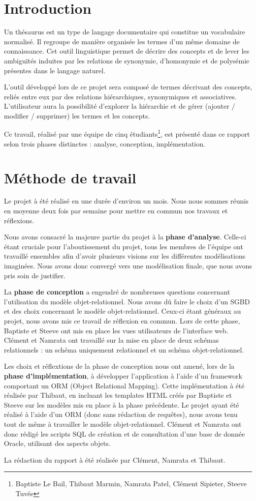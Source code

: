 \chapter*{Introduction}
Un thésaurus est un type de langage documentaire qui constitue un vocabulaire normalisé. Il regroupe de manière organisée les termes d'un même domaine de connaissance. Cet outil linguistique permet de décrire des concepts et de lever les ambiguïtés induites par les relations de synonymie, d'homonymie et de polysémie présentes dans le langage naturel.

L'outil développé lors de ce projet sera composé de termes décrivant des concepts, reliés entre eux par des relations hiérarchiques, synonymiques et associatives. L'utilisateur aura la possibilité d'explorer la hiérarchie et de gérer (ajouter / modifier / supprimer) les termes et les concepts.

Ce travail, réalisé par une équipe de cinq étudiants\footnote{Baptiste Le Bail, Thibaut Marmin, Namrata Patel, Clément Sipieter, Steeve Tuvée}, est présenté dans ce rapport selon trois phases distinctes : analyse, conception, implémentation.
\clearemptydoublepage
\chapter*{Méthode de travail}

Le projet à été réalisé en une durée d'environ un mois. Nous nous sommes réunis en moyenne deux fois par semaine pour mettre en commun nos travaux et réflexions.

Nous avons consacré la majeure partie du projet à la \textbf{phase d'analyse}. Celle-ci étant cruciale pour l'aboutissement du projet, tous les membres de l'équipe ont travaillé ensembles afin d'avoir plusieurs visions sur les différentes modélisations imaginées. Nous avons donc convergé vers une modélisation finale, que nous avons pris soin de justifier.

La \textbf{phase de conception} a engendré de nombreuses questions concernant l'utilisation du modèle objet-relationnel. Nous avons dû faire le choix d'un SGBD et des choix concernant le modèle objet-relationnel. Ceux-ci étant généraux au projet, nous avons mis ce travail de réflexion en commun. Lors de cette phase, Baptiste et Steeve ont mis en place les vues utilisateurs de l'interface web. Clément et Namrata ont travaillé sur la mise en place de deux schémas relationnels : un schéma uniquement relationnel et un schéma objet-relationnel.

Les choix et réflextions de la phase de conception nous ont amené, lors de la \textbf{phase d'implémentation}, à développer l'application à l'aide d'un framework comportant un ORM (Object Relational Mapping). Cette implémentation à été réalisée par Thibaut, en incluant les templates HTML créés par Baptiste et Steeve sur les modèles mis en place à la phase précédente. Le projet ayant été réalisé à l'aide d'un ORM (donc sans rédaction de requêtes), nous avons tenu tout de même à travailler le modèle objet-relationnel. Clément et Namrata ont donc rédigé les scripts SQL de création et de consultation d'une base de donnée Oracle, utilisant des aspects objets.

La rédaction du rapport à été réalisée par Clément, Namrata et Thibaut.